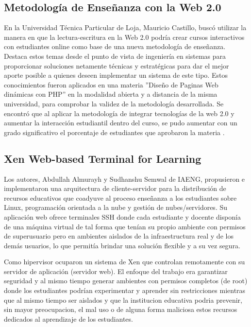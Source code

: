 \subsection{Metodología de Enseñanza con la Web 2.0}
En la Universidad Técnica Particular de Loja, Mauricio Castillo, buscó utilizar la manera en que la lectura-escritura en la Web 2.0 podría crear cursos interactivos con estudiantes online como base de una nueva metodología de enseñanza. Destaca estos temas desde el punto de vista de ingeniería en sistemas para proporcionar soluciones netamente técnicas y estratégicas para dar el mejor aporte posible a quienes deseen implementar un sistema de este tipo. Estos conocimientos fueron aplicados en una materia ''Diseño de Paginas Web dinámicas con PHP'' en la modalidad abierta y a distancia de la misma universidad, para comprobar la validez de la metodología desarrollada. Se encontró que al aplicar la metodología de integrar tecnologías de la web 2.0 y aumentar la interacción estudiantil dentro del curso, se pudo aumentar con un grado significativo el porcentaje de estudiantes que aprobaron la materia \citep{UTPL-Thesis-Edu-Web-2}.

   
\subsection{Xen Web-based Terminal for Learning}
Los autores, Abdullah Almurayh y Sudhanshu Semwal de IAENG, propusieron e implementaron una arquitectura de cliente-servidor para la distribución de recursos educativos que coadyuve al proceso enseñanza a los estudiantes sobre Linux, programación orientada a la nube y gestión de nubes/servidores. Su aplicación web ofrece terminales SSH donde cada estudiante y docente disponía de una máquina virtual de tal forma que tenían su propio ambiente con permisos de superusuario pero en ambientes aislados de la infraestructura real y de los demás usuarios, lo que permitía brindar una solución flexible y a su vez segura.

Como hipervisor ocuparon un sistema de Xen que controlan remotamente con su servidor de aplicación (servidor web). El enfoque del trabajo era garantizar seguridad y al mismo tiempo generar ambientes con permisos completos (de root) donde los estudiantes podrían experimentar y aprender sin restricciones mientras que al mismo tiempo ser aislados y que la institucion educativa podria prevenir, sin mayor preocupacion, el mal uso o de alguna forma maliciosa estos recursos dedicados al aprendizaje de los estudiantes.

